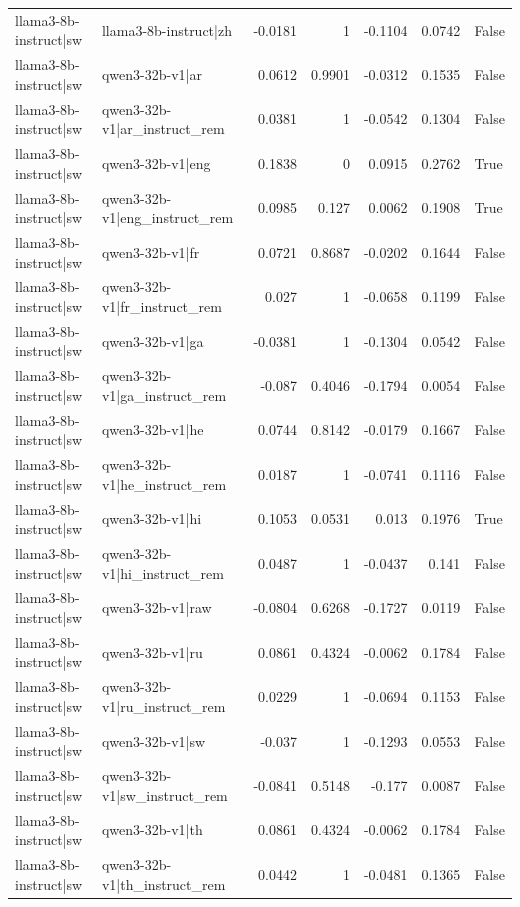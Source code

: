 \begin{table}
\begin{tabular}{l l r r r r l}
llama3-8b-instruct|sw & llama3-8b-instruct|zh & -0.0181 & 1 & -0.1104 & 0.0742 & False \\
llama3-8b-instruct|sw & qwen3-32b-v1|ar & 0.0612 & 0.9901 & -0.0312 & 0.1535 & False \\
llama3-8b-instruct|sw & qwen3-32b-v1|ar_instruct_rem & 0.0381 & 1 & -0.0542 & 0.1304 & False \\
llama3-8b-instruct|sw & qwen3-32b-v1|eng & 0.1838 & 0 & 0.0915 & 0.2762 & True \\
llama3-8b-instruct|sw & qwen3-32b-v1|eng_instruct_rem & 0.0985 & 0.127 & 0.0062 & 0.1908 & True \\
llama3-8b-instruct|sw & qwen3-32b-v1|fr & 0.0721 & 0.8687 & -0.0202 & 0.1644 & False \\
llama3-8b-instruct|sw & qwen3-32b-v1|fr_instruct_rem & 0.027 & 1 & -0.0658 & 0.1199 & False \\
llama3-8b-instruct|sw & qwen3-32b-v1|ga & -0.0381 & 1 & -0.1304 & 0.0542 & False \\
llama3-8b-instruct|sw & qwen3-32b-v1|ga_instruct_rem & -0.087 & 0.4046 & -0.1794 & 0.0054 & False \\
llama3-8b-instruct|sw & qwen3-32b-v1|he & 0.0744 & 0.8142 & -0.0179 & 0.1667 & False \\
llama3-8b-instruct|sw & qwen3-32b-v1|he_instruct_rem & 0.0187 & 1 & -0.0741 & 0.1116 & False \\
llama3-8b-instruct|sw & qwen3-32b-v1|hi & 0.1053 & 0.0531 & 0.013 & 0.1976 & True \\
llama3-8b-instruct|sw & qwen3-32b-v1|hi_instruct_rem & 0.0487 & 1 & -0.0437 & 0.141 & False \\
llama3-8b-instruct|sw & qwen3-32b-v1|raw & -0.0804 & 0.6268 & -0.1727 & 0.0119 & False \\
llama3-8b-instruct|sw & qwen3-32b-v1|ru & 0.0861 & 0.4324 & -0.0062 & 0.1784 & False \\
llama3-8b-instruct|sw & qwen3-32b-v1|ru_instruct_rem & 0.0229 & 1 & -0.0694 & 0.1153 & False \\
llama3-8b-instruct|sw & qwen3-32b-v1|sw & -0.037 & 1 & -0.1293 & 0.0553 & False \\
llama3-8b-instruct|sw & qwen3-32b-v1|sw_instruct_rem & -0.0841 & 0.5148 & -0.177 & 0.0087 & False \\
llama3-8b-instruct|sw & qwen3-32b-v1|th & 0.0861 & 0.4324 & -0.0062 & 0.1784 & False \\
llama3-8b-instruct|sw & qwen3-32b-v1|th_instruct_rem & 0.0442 & 1 & -0.0481 & 0.1365 & False \\

\end{tabular}
\end{table}

